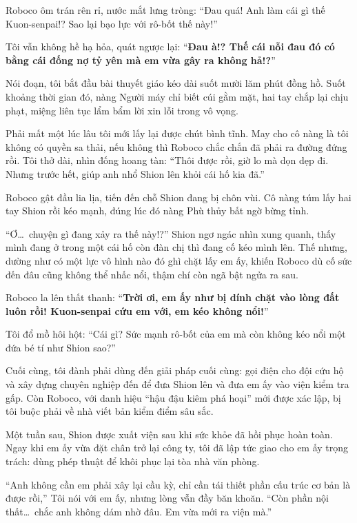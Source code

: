 \documentclass[../main.tex]{subfiles}
\begin{document}
Roboco ôm trán rên rỉ, nước mắt lưng tròng: ``Đau quá! Anh làm cái gì thế Kuon-senpai!? Sao lại bạo lực với rô-bốt thế này!''

Tôi vẫn không hề hạ hỏa, quát ngược lại: ``\textbf{Đau à!? Thế cái nỗi đau đó có bằng cái đống nợ tỷ yên mà em vừa gây ra không hả!?}''

Nói đoạn, tôi bắt đầu bài thuyết giáo kéo dài suốt mười lăm phút đồng hồ. Suốt khoảng thời gian đó, nàng Người máy chỉ biết cúi gằm mặt, hai tay chắp lại chịu phạt, miệng liên tục lẩm bẩm lời xin lỗi trong vô vọng.

Phải mất một lúc lâu tôi mới lấy lại được chút bình tĩnh. May cho cô nàng là tôi không có quyền sa thải, nếu không thì Roboco chắc chắn đã phải ra đường đứng rồi. Tôi thở dài, nhìn đống hoang tàn: ``Thôi được rồi, giờ lo mà dọn dẹp đi. Nhưng trước hết, giúp anh nhổ Shion lên khỏi cái hố kia đã.''

Roboco gật đầu lia lịa, tiến đến chỗ Shion đang bị chôn vùi. Cô nàng túm lấy hai tay Shion rồi kéo mạnh, đúng lúc đó nàng Phù thủy bất ngờ bừng tỉnh.

``Ơ\dots\ chuyện gì đang xảy ra thế này!?'' Shion ngơ ngác nhìn xung quanh, thấy mình đang ở trong một cái hố còn đàn chị thì đang cố kéo mình lên. Thế nhưng, dường như có một lực vô hình nào đó ghì chặt lấy em ấy, khiến Roboco dù cố sức đến đâu cũng không thể nhấc nổi, thậm chí còn ngã bật ngửa ra sau.

Roboco la lên thất thanh: ``\textbf{Trời ơi, em ấy như bị dính chặt vào lòng đất luôn rồi! Kuon-senpai cứu em với, em kéo không nổi!}''

Tôi đổ mồ hôi hột: ``Cái gì? Sức mạnh rô-bốt của em mà còn không kéo nổi một đứa bé tí như Shion sao?''

Cuối cùng, tôi đành phải dùng đến giải pháp cuối cùng: gọi điện cho đội cứu hộ và xây dựng chuyên nghiệp đến để đưa Shion lên và đưa em ấy vào viện kiểm tra gấp. Còn Roboco, với danh hiệu ``hậu đậu kiêm phá hoại'' mới được xác lập, bị tôi buộc phải về nhà viết bản kiểm điểm sâu sắc.

\ct

Một tuần sau, Shion được xuất viện sau khi sức khỏe đã hồi phục hoàn toàn. Ngay khi em ấy vừa đặt chân trở lại công ty, tôi đã lập tức giao cho em ấy trọng trách: dùng phép thuật để khôi phục lại tòa nhà văn phòng.

``Anh không cần em phải xây lại cầu kỳ, chỉ cần tái thiết phần cấu trúc cơ bản là được rồi,'' Tôi nói với em ấy, nhưng lòng vẫn đầy băn khoăn. ``Còn phần nội thất\dots\ chắc anh không dám nhờ đâu. Em vừa mới ra viện mà.''
\end{document}
